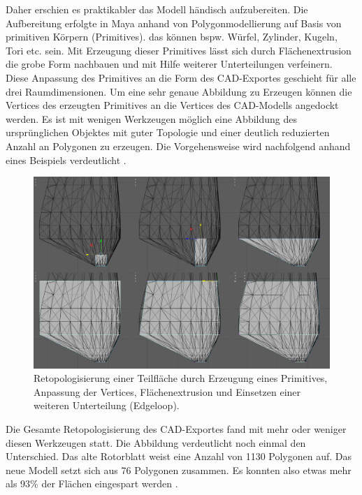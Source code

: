Daher erschien es praktikabler das Modell händisch aufzubereiten. Die Aufbereitung erfolgte in Maya anhand von Polygonmodellierung auf Basis von primitiven Körpern (Primitives). das können bspw. Würfel, Zylinder, Kugeln, Tori etc. sein.  Mit Erzeugung dieser Primitives lässt sich durch Flächenextrusion die grobe Form nachbauen und mit Hilfe weiterer Unterteilungen verfeinern. Diese Anpassung des Primitives an die Form des CAD-Exportes geschieht für alle drei Raumdimensionen. Um eine sehr genaue Abbildung zu Erzeugen können die Vertices des erzeugten Primitives an die Vertices des CAD-Modells \glqq angedockt\grqq\, werden. Es ist mit wenigen Werkzeugen möglich eine Abbildung des ursprünglichen Objektes mit guter Topologie und einer deutlich reduzierten Anzahl an Polygonen zu erzeugen. Die Vorgehensweise wird nachfolgend anhand eines Beispiels verdeutlicht .

\begin{figure}[H]
	\centering
	\captionsetup{width=1\textwidth}
	\includegraphics[keepaspectratio, width=1\textwidth]{bildquellen/mod}
	\caption{Retopologisierung einer Teilfläche durch Erzeugung eines Primitives, Anpassung der Vertices, Flächenextrusion und Einsetzen einer weiteren Unterteilung (Edgeloop).}
	\label{fig:2.5}
\end{figure}
 \clearpage
Die Gesamte Retopologisierung des CAD-Exportes fand mit mehr oder weniger diesen Werkzeugen statt. Die Abbildung verdeutlicht noch einmal den Unterschied. Das alte Rotorblatt weist eine Anzahl von 1130 Polygonen auf. Das neue Modell setzt sich aus 76 Polygonen zusammen. Es konnten also etwas mehr als 93\% der Flächen eingespart werden . 

